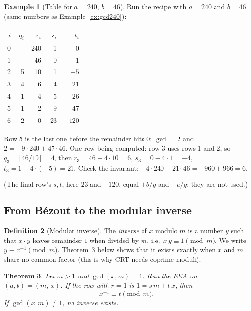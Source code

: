 \documentclass[11pt]{article}
\newtheorem{theorem}{Theorem}[section]
\theoremstyle{definition}
\newtheorem{definition}[theorem]{Definition}
\newtheorem{example}[theorem]{Example}
\theoremstyle{remark}
\newcommand{\hl}{\rowcolor{green!15}}   %
\begin{document}
\begin{example}[Table for $a=240$, $b=46$]\label{ex:table240}
Run the recipe with $a=240$ and $b=46$ (same numbers as Example~\ref{ex:gcd240}):
\begin{center}
\renewcommand{\arraystretch}{1.2}
\begin{tabular}{@{}rrrrr@{}}
\toprule
$i$ & $q_i$ & $r_i$ & $s_i$ & $t_i$ \\
\midrule
0 & --- & 240 & 1 & 0 \\
1 & --- & 46 & 0 & 1 \\
2 & 5 & 10 & 1 & $-5$ \\
3 & 4 & 6 & $-4$ & 21 \\
4 & 1 & 4 & 5 & $-26$ \\
\hl 5 & 1 & 2 & $-9$ & 47 \\
6 & 2 & 0 & 23 & $-120$ \\
\bottomrule
\end{tabular}
\end{center}
Row 5 is the last one before the remainder hits $0$: $\gcd=2$ and $2=-9\cdot240+47\cdot46$. One row being computed: row 3 uses rows 1 and 2, so $q_3=\lfloor46/10\rfloor=4$, then $r_3=46-4\cdot10=6$, $s_3=0-4\cdot1=-4$, $t_3=1-4\cdot(-5)=21$. Check the invariant: $-4\cdot240+21\cdot46=-960+966=6$. \checkmark

(The final row's $s,t$, here $23$ and $-120$, equal $\pm b/g$ and $\mp a/g$; they are not used.)
\end{example}

\subsection{From B\'ezout to the modular inverse}\label{sec:eea-inverse}


\begin{definition}[Modular inverse]\label{def:inverse}
The \emph{inverse} of $x$ modulo $m$ is a number $y$ such that $x\cdot y$ leaves remainder $1$ when divided by $m$, i.e.\ $x\,y\equiv1\pmod m$. We write $y\equiv x^{-1}\pmod m$. Theorem~\ref{thm:eea-inverse} below shows that it exists exactly when $x$ and $m$ share no common factor (this is why CRT needs coprime moduli).
\end{definition}

\begin{theorem}\label{thm:eea-inverse}
Let $m>1$ and $\gcd(x,m)=1$. Run the EEA on $(a,b)=(m,\,x)$. If the row with $r=1$ is $1=s\,m+t\,x$, then
\[
x^{-1}\equiv t \pmod m.
\]
If $\gcd(x,m)\ne1$, no inverse exists.
\end{theorem}
\end{document}
